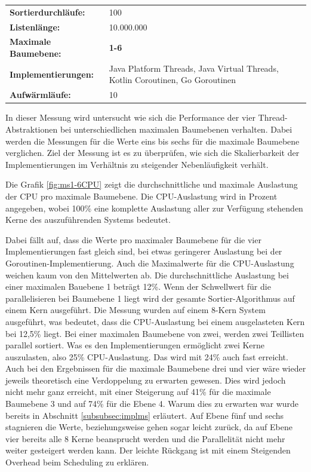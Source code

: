 \documentclass[fontsize=12pt,paper=a4,twoside=semi,parskip=half-,headsepline,headinclude]{scrreprt}
\begin{document}
\begin{tabularx}{\textwidth}{@{}lX@{}}
	\textbf{Sortierdurchläufe:} & 100 \\
	\textbf{Listenlänge:} & 10.000.000 \\
	\textbf{Maximale Baumebene:} & \textbf{1-6} \\
	\textbf{Implementierungen:} & Java Platform Threads, Java Virtual Threads, Kotlin Coroutinen, Go Goroutinen \\
	\textbf{Aufwärmläufe:} & 10
\end{tabularx}

In dieser Messung wird untersucht wie sich die Performance der vier Thread-Ab\-strak\-tio\-nen bei unterschiedlichen maximalen Baumebenen verhalten. Dabei werden die Messungen für die Werte eins bis sechs für die maximale Baumebene verglichen. Ziel der Messung ist es zu überprüfen, wie sich die Skalierbarkeit der Implementierungen im Verhältnis zu steigender Nebenläufigkeit verhält.

Die Grafik \ref{fig:ms1-6CPU} zeigt die durchschnittliche und maximale Auslastung der CPU pro maximale Baumebene. Die CPU-Auslastung wird in Prozent angegeben, wobei 100\% eine komplette Auslastung aller zur Verfügung stehenden Kerne des auszuführenden Systems bedeutet.

Dabei fällt auf, dass die Werte pro maximaler Baumebene für die vier Implementierungen fast gleich sind, bei etwas geringerer Auslastung bei der Goroutinen-Implementierung. Auch die Maximalwerte für die CPU-Auslastung weichen kaum von den Mittelwerten ab. Die durchschnittliche Auslastung bei einer maximalen Bauebene 1 beträgt 12\%. Wenn der Schwellwert für die parallelisieren bei Baumebene 1 liegt wird der gesamte Sortier-Algorithmus auf einem Kern ausgeführt. Die Messung wurden auf einem 8-Kern System ausgeführt, was bedeutet, dass die CPU-Auslastung bei einem ausgelasteten Kern bei 12,5\% liegt. Bei einer maximalen 
Baumebene von zwei, werden zwei Teillisten parallel sortiert. Was es den Implementierungen ermöglicht zwei Kerne auszulasten, also 25\% CPU-Auslastung. Das wird mit 24\% auch fast erreicht. Auch bei den Ergebnissen für die maximale Baumebene drei und vier wäre wieder jeweils theoretisch eine Verdoppelung zu erwarten gewesen. Dies wird jedoch nicht mehr ganz erreicht, mit einer Steigerung auf 41\% für die maximale Baumebene 3 und auf 74\% für die Ebene 4. Warum dies zu erwarten war wurde bereits in Abschnitt \ref{subsubsec:implms} erläutert. Auf Ebene fünf und sechs stagnieren die Werte, beziehungsweise gehen sogar leicht zurück, da auf Ebene vier bereits alle 8 Kerne beansprucht werden und die Parallelität nicht mehr weiter gesteigert werden kann. Der leichte Rückgang ist mit einem Steigenden Overhead beim Scheduling zu erklären.
\end{document}
